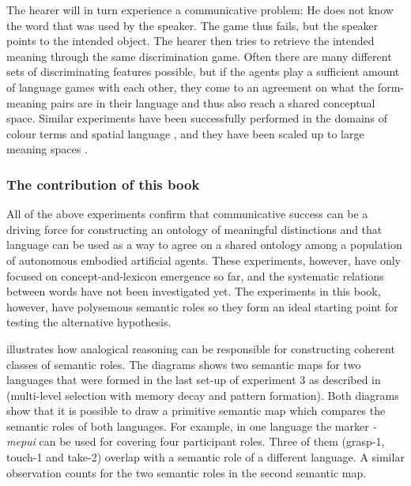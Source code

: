 \newpage
The hearer will in turn experience a communicative problem: He does not know the word that was used by the speaker. The game thus fails, but the speaker points to the intended object. The hearer then tries to retrieve the intended meaning through the same discrimination game. Often there are many different sets of discriminating features possible, but if the agents play a sufficient amount of language games with each other, they come to an agreement on what the form-meaning pairs are in their language and thus also reach a shared conceptual space. Similar experiments have been successfully performed in the domains of colour terms \citep{steels05coordinating} and spatial language \citep{steels08perspective-alignment}, and they have been scaled up to large meaning spaces \citep{wellens08coping}.



\subsubsection{The contribution of this book}
All of the above experiments confirm that communicative success can be a driving force for constructing an ontology of meaningful distinctions and that language can be used as a way to agree on a shared ontology among a population of autonomous embodied artificial agents. These experiments, however, have only focused on concept-and-lexicon emergence so far, and the systematic relations between words have not been investigated yet. The experiments in this book, however, have polysemous semantic roles so they form an ideal starting point for testing the alternative hypothesis.

 illustrates how analogical reasoning can be responsible for constructing coherent classes of semantic roles. The diagrams shows two semantic maps for two languages that were formed in the last set-up of experiment 3 as described in  (multi-level selection with memory decay and pattern formation). Both diagrams show that it is possible to draw a primitive semantic map which compares the semantic roles of both languages. For example, in one language the marker {\em -mepui} can be used for covering four participant roles. Three of them (grasp-1, touch-1 and take-2) overlap with a semantic role of a different language. A similar observation counts for the two semantic roles in the second semantic map.


